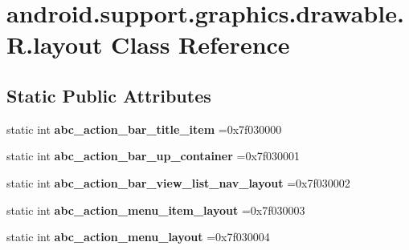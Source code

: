 \hypertarget{classandroid_1_1support_1_1graphics_1_1drawable_1_1R_1_1layout}{}\section{android.\+support.\+graphics.\+drawable.\+R.\+layout Class Reference}
\label{classandroid_1_1support_1_1graphics_1_1drawable_1_1R_1_1layout}
\subsection*{Static Public Attributes}
\begin{DoxyCompactItemize}
\item 
\mbox{\label{classandroid_1_1support_1_1graphics_1_1drawable_1_1R_1_1layout_ac1f903b38e19664cb3a9e8718ca81657}} 
static int {\bfseries abc\+\_\+action\+\_\+bar\+\_\+title\+\_\+item} =0x7f030000
\item 
\mbox{\label{classandroid_1_1support_1_1graphics_1_1drawable_1_1R_1_1layout_aee9403c5a5289655224ac01a3d59cf60}} 
static int {\bfseries abc\+\_\+action\+\_\+bar\+\_\+up\+\_\+container} =0x7f030001
\item 
\mbox{\label{classandroid_1_1support_1_1graphics_1_1drawable_1_1R_1_1layout_a3bbc17978c681e3bd220ccfa927abc06}} 
static int {\bfseries abc\+\_\+action\+\_\+bar\+\_\+view\+\_\+list\+\_\+nav\+\_\+layout} =0x7f030002
\item 
\mbox{\label{classandroid_1_1support_1_1graphics_1_1drawable_1_1R_1_1layout_af34f2d165dc97c26a55d285ccd118abe}} 
static int {\bfseries abc\+\_\+action\+\_\+menu\+\_\+item\+\_\+layout} =0x7f030003
\item 
\mbox{\label{classandroid_1_1support_1_1graphics_1_1drawable_1_1R_1_1layout_afd0630cfaf84a68fb2091a7aeec26ea4}} 
static int {\bfseries abc\+\_\+action\+\_\+menu\+\_\+layout} =0x7f030004
\item 
\mbox{\label{classandroid_1_1support_1_1graphics_1_1drawable_1_1R_1_1layout_a9fde377abf459549edf7dc89c19b840a}} 

\end{DoxyCompactItemize}
